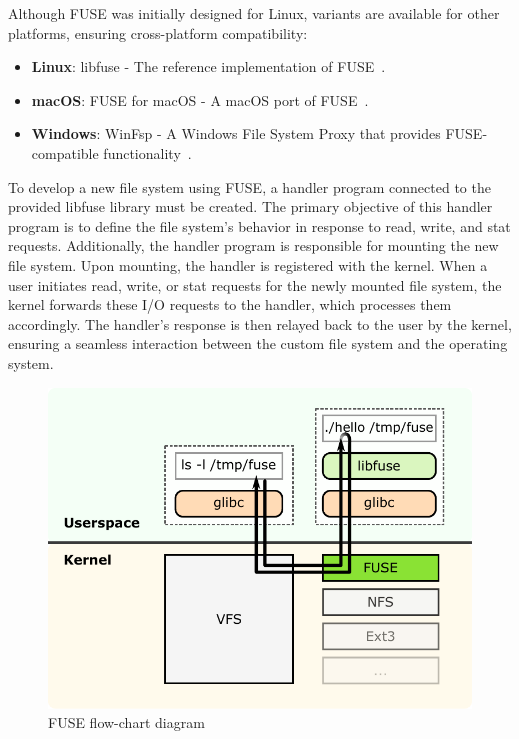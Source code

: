 Although FUSE was initially designed for Linux, variants are available for other platforms, ensuring cross-platform compatibility:

\begin{itemize}
    \item \textbf{Linux}: libfuse - The reference implementation of FUSE~\cite{libfuse}.
    \item \textbf{macOS}: FUSE for macOS - A macOS port of FUSE~\cite{osxfuse}.
    \item \textbf{Windows}: WinFsp - A Windows File System Proxy that provides FUSE-compatible functionality~\cite{winfsp}.
\end{itemize}

To develop a new file system using FUSE, a handler program connected to the provided libfuse library must be created.
The primary objective of this handler program is to define the file system's behavior in response to read, write, and stat requests.
Additionally, the handler program is responsible for mounting the new file system.
Upon mounting, the handler is registered with the kernel.
When a user initiates read, write, or stat requests for the newly mounted file system, the kernel forwards these I/O requests to the handler, which processes them accordingly.
The handler's response is then relayed back to the user by the kernel, ensuring a seamless interaction between the custom file system and the operating system.

\begin{figure}[ht]
    \centering
    \includegraphics[width=\linewidth]{img/fuse_diagram}
    \caption{FUSE flow-chart diagram}
\end{figure}

